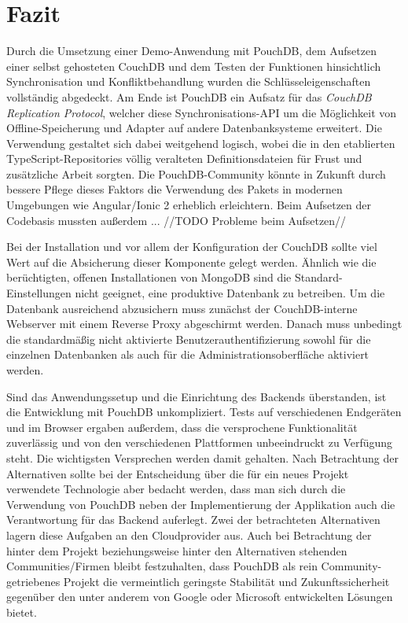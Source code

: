 \chapter{Fazit}
\label{Fazit}
Durch die Umsetzung einer Demo-Anwendung mit PouchDB, dem Aufsetzen einer selbst gehosteten CouchDB und dem Testen der Funktionen hinsichtlich Synchronisation und Konfliktbehandlung wurden die Schlüsseleigenschaften vollständig abgedeckt. Am Ende ist PouchDB ein Aufsatz für das \emph{CouchDB Replication Protocol}, welcher diese Synchronisations-API um die Möglichkeit von Offline-Speicherung und Adapter auf andere Datenbanksysteme erweitert. Die Verwendung gestaltet sich dabei weitgehend logisch, wobei die in den etablierten TypeScript-Repositories völlig veralteten Definitionsdateien für Frust und zusätzliche Arbeit sorgten. Die PouchDB-Community könnte in Zukunft durch bessere Pflege dieses Faktors die Verwendung des Pakets in modernen Umgebungen wie Angular/Ionic 2 erheblich erleichtern. Beim Aufsetzen der Codebasis mussten außerdem ... //TODO Probleme beim Aufsetzen//

Bei der Installation und vor allem der Konfiguration der CouchDB sollte viel Wert auf die Absicherung dieser Komponente gelegt werden. Ähnlich wie die berüchtigten, offenen Installationen von MongoDB sind die Standard-Einstellungen nicht geeignet, eine produktive Datenbank zu betreiben. Um die Datenbank ausreichend abzusichern muss zunächst der CouchDB-interne Webserver mit einem Reverse Proxy abgeschirmt werden. Danach muss unbedingt die standardmäßig nicht aktivierte Benutzerauthentifizierung sowohl für die einzelnen Datenbanken als auch für die Administrationsoberfläche aktiviert werden.

Sind das Anwendungssetup und die Einrichtung des Backends überstanden, ist die Entwicklung mit PouchDB unkompliziert. Tests auf verschiedenen Endgeräten und im Browser ergaben außerdem, dass die versprochene Funktionalität zuverlässig und von den verschiedenen Plattformen unbeeindruckt zu Verfügung steht. Die wichtigsten Versprechen werden damit gehalten.
Nach Betrachtung der Alternativen sollte bei der Entscheidung über die für ein neues Projekt verwendete Technologie aber bedacht werden, dass man sich durch die Verwendung von PouchDB neben der Implementierung der Applikation auch die Verantwortung für das Backend auferlegt. Zwei der betrachteten Alternativen lagern diese Aufgaben an den Cloudprovider aus. Auch bei Betrachtung der hinter dem Projekt beziehungsweise hinter den Alternativen stehenden Communities/Firmen bleibt festzuhalten, dass PouchDB als rein Community-getriebenes Projekt die vermeintlich geringste Stabilität und Zukunftssicherheit gegenüber den unter anderem von Google oder Microsoft entwickelten Lösungen bietet.
